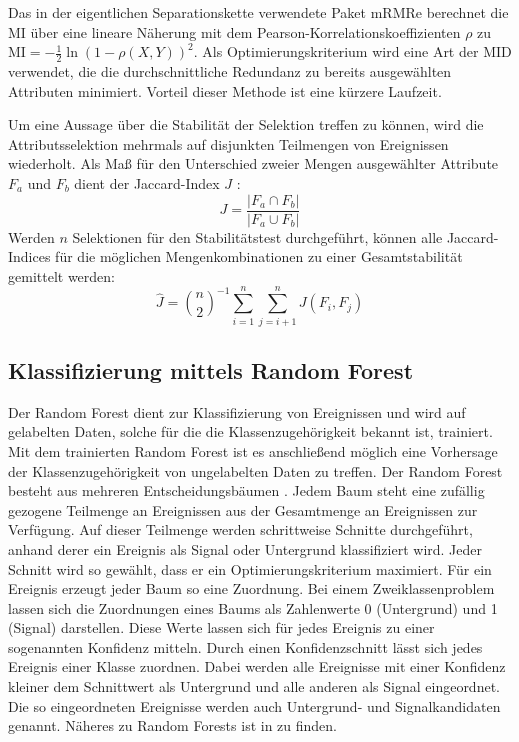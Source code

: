 Das in der eigentlichen Separationskette verwendete Paket mRMRe \cite{mrmre} berechnet die $\text{MI}$ über eine lineare Näherung mit dem Pearson-Korrelationskoeffizienten $ρ$ zu $\text{MI}= -\frac12 \ln \left(1- ρ (X,Y) \right)^2$. 
Als Optimierungskriterium wird eine Art der MID verwendet, die die durchschnittliche Redundanz zu bereits ausgewählten Attributen minimiert.
Vorteil dieser Methode ist eine kürzere Laufzeit.

Um eine Aussage über die Stabilität der Selektion treffen zu können, wird die Attributsselektion mehrmals auf disjunkten Teilmengen von Ereignissen wiederholt.
Als Maß für den Unterschied zweier Mengen ausgewählter Attribute $F_a$ und $F_b$ dient der Jaccard-Index $J$ \cite{jaccardIndex}:
\begin{equation}
    J = \frac{|F_a \cap F_b|}{|F_a \cup F_b|}
\end{equation}
Werden $n$ Selektionen für den Stabilitätstest durchgeführt, können alle Jaccard-Indices für die möglichen Mengenkombinationen zu einer Gesamtstabilität gemittelt werden:
\begin{equation}
    \hat{J} = \binom{n}{2}^{-1} \sum ^n _{i=1} \sum ^n _{j=i+1} J(F_i,F_j)
\end{equation}


\subsection*{Klassifizierung mittels Random Forest }
Der Random Forest dient zur Klassifizierung von Ereignissen und wird auf gelabelten Daten, solche für die die Klassenzugehörigkeit bekannt ist, trainiert.
Mit dem trainierten Random Forest ist es anschließend möglich eine Vorhersage der Klassenzugehörigkeit von ungelabelten Daten zu treffen.
Der Random Forest  besteht aus mehreren Entscheidungsbäumen \cite{DecisionTrees}.
Jedem Baum steht eine zufällig gezogene Teilmenge an Ereignissen aus der Gesamtmenge an Ereignissen zur Verfügung. 
Auf dieser Teilmenge werden schrittweise Schnitte durchgeführt, anhand derer ein Ereignis als Signal oder Untergrund klassifiziert wird.
Jeder Schnitt wird so gewählt, dass er ein Optimierungskriterium maximiert.
Für ein Ereignis erzeugt jeder Baum so eine Zuordnung.
Bei einem Zweiklassenproblem lassen sich die Zuordnungen eines Baums als Zahlenwerte 0 (Untergrund) und 1 (Signal) darstellen.
Diese Werte lassen sich für jedes Ereignis zu einer sogenannten Konfidenz mitteln.
Durch einen Konfidenzschnitt lässt sich jedes Ereignis einer Klasse zuordnen. 
Dabei werden alle Ereignisse mit einer Konfidenz kleiner dem Schnittwert als Untergrund und alle anderen als Signal eingeordnet. 
Die so eingeordneten Ereignisse werden auch Untergrund- und Signalkandidaten genannt.
Näheres zu Random Forests ist in \cite{RandomForest} zu finden.

